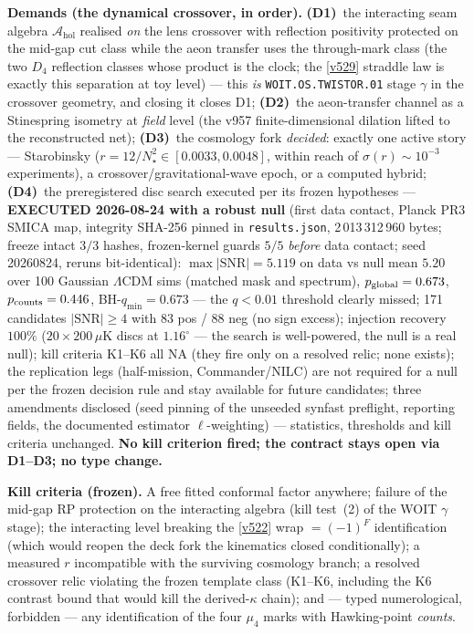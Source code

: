 \documentclass[11pt,a4paper]{article}
\begin{document}
\par\smallskip\noindent\textbf{Demands (the dynamical crossover, in order).}
\textbf{(D1)}~the interacting seam algebra $\mathcal A_{\mathrm{hol}}$ realised \emph{on} the lens
crossover with reflection positivity protected on the mid-gap cut class while the aeon transfer
uses the through-mark class (the two $D_4$ reflection classes whose product is the clock; the
\vref{v529} straddle law is exactly this separation at toy level) --- this \emph{is}
\texttt{WOIT.OS.TWISTOR.01} stage $\gamma$ in the crossover geometry, and closing it closes D1;
\textbf{(D2)}~the aeon-transfer channel as a Stinespring isometry at \emph{field} level (the v957
finite-dimensional dilation lifted to the reconstructed net); \textbf{(D3)}~the cosmology fork
\emph{decided}: exactly one active story --- Starobinsky ($r=12/N_\star^2\in[0.0033,0.0048]$,
within reach of $\sigma(r)\sim10^{-3}$ experiments), a crossover/gravitational-wave epoch, or a
computed hybrid; \textbf{(D4)}~the preregistered disc search executed per its frozen hypotheses ---
\textbf{EXECUTED 2026-08-24 with a robust null} (first data contact, Planck PR3 SMICA map,
integrity SHA-256 pinned in \texttt{results.json}, 2\,013\,312\,960 bytes; freeze intact $3/3$
hashes, frozen-kernel guards $5/5$ \emph{before} data contact; seed 20260824, reruns
bit-identical): $\max|\mathrm{SNR}| = 5.119$ on data vs null mean $5.20$ over 100 Gaussian
$\Lambda$CDM sims (matched mask and spectrum), $p_{\rm global} = 0.673$, $p_{\rm counts} = 0.446$,
BH-$q_{\min} = 0.673$ --- the $q < 0.01$ threshold clearly missed; 171 candidates $|\mathrm{SNR}|
\ge 4$ with $83$ pos / $88$ neg (no sign excess); injection recovery $100\%$ ($20 \times
200\,\mu$K discs at $1.16^\circ$ --- the search is well-powered, the null is a real null); kill
criteria K1--K6 all NA (they fire only on a resolved relic; none exists); the replication legs
(half-mission, Commander/NILC) are not required for a null per the frozen decision rule and stay
available for future candidates; three amendments disclosed (seed pinning of the unseeded
synfast preflight, reporting fields, the documented estimator $\ell$-weighting) --- statistics,
thresholds and kill criteria unchanged.  \textbf{No kill criterion fired; the contract stays
open via D1--D3; no type change.}

\par\smallskip\noindent\textbf{Kill criteria (frozen).}  A free fitted conformal factor anywhere;
failure of the mid-gap RP protection on the interacting algebra (kill test~(2) of the WOIT
$\gamma$ stage); the interacting level breaking the \vref{v522} wrap $=(-1)^F$ identification
(which would reopen the deck fork the kinematics closed conditionally); a measured $r$
incompatible with the surviving cosmology branch; a resolved crossover relic violating the frozen
template class (K1--K6, including the K6 contrast bound that would kill the derived-$\kappa$
chain); and --- typed numerological, forbidden --- any identification of the four $\mu_4$ marks
with Hawking-point \emph{counts}.
\end{document}
